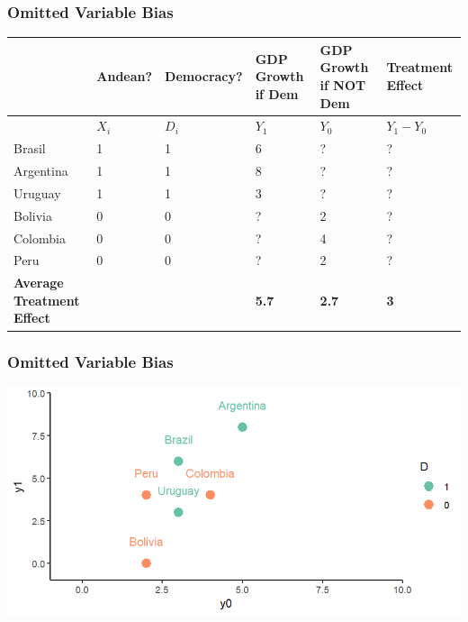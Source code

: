 \documentclass[xcolor=x11names,compress]{beamer}\usepackage[]{graphicx}\usepackage[]{color}
\makeatletter
\def\maxwidth{ %
  \ifdim\Gin@nat@width>\linewidth
    \linewidth
  \else
    \Gin@nat@width
  \fi
}
\newenvironment{knitrout}{}{} %
\renewcommand{\(}{\begin{columns}}
\renewcommand{\)}{\end{columns}}
\newcommand{\<}[1]{\begin{column}{#1}}
\renewcommand{\>}{\end{column}}
\makeatother
\begin{document}
\begin{frame}
\frametitle{Omitted Variable Bias}
\scriptsize
\begin{table}[htbp]
  \centering
    \begin{tabular}{|p{1.6cm}|p{1.6cm}|p{1.6cm}|p{1.6cm}|p{1.6cm}|p{1.6cm}|}
    \hline
           & \multicolumn{1}{|p{1.6cm}|}{Andean?} & \multicolumn{1}{|p{1.6cm}|}{Democracy?} & \multicolumn{1}{p{1.6cm}|}{GDP Growth if Dem} & \multicolumn{1}{p{1.6cm}|}{GDP Growth if NOT Dem} & \textbf{Treatment Effect} \bigstrut\\
    \hline
          & \multicolumn{1}{|p{1.6cm}|}{$X_i$} & \multicolumn{1}{p{1.6cm}|}{$D_i$} & \multicolumn{1}{p{1.6cm}|}{$Y_1$} & \multicolumn{1}{p{1.6cm}|}{$Y_0$} & \multicolumn{1}{p{1.6cm}|}{$Y_{1} - Y_{0}$} \bigstrut\\
    \hline
    Brasil & 1 & 1 & 6     & ?     & ? \bigstrut\\
    \hline
    Argentina & 1 & 1 & 8    & ?     & ? \bigstrut\\
    \hline
    Uruguay & 1 & 1 & 3 & ? & ?  \bigstrut\\
    \hline
    Bolivia & 0 & 0 & ?     & 2     & ? \bigstrut\\
    \hline
    Colombia & 0 & 0 & ?    & 4    & ? \bigstrut\\
    \hline
    Peru & 0 & 0 & ?     & 2     & ? \bigstrut\\
    \hline
    \textbf{Average Treatment Effect}& & & \textbf{5.7} & \textbf{2.7} & \textbf{3} \bigstrut\\
    \hline
    \end{tabular}%
  \label{tab:addlabel}%
\end{table}%
\normalsize
\end{frame}

\begin{frame}
\frametitle{Omitted Variable Bias}
\begin{knitrout}
\color{fgcolor}
\includegraphics[width=\maxwidth]{figure/Chart_1-1} 

\end{knitrout}
\end{frame}
\end{document}
